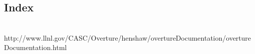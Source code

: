 \documentclass{article}
\begin{document}
\begin{htmlonly}
\clearpage
\section{Index}

\begin{flushleft}
 \\
{http://www.llnl.gov/CASC/Overture/henshaw/overtureDocumentation/overtureDocumentation.html} 
\end{flushleft}


\end{htmlonly}

\clearpage



\begin{latexonly}
\printindex
\end{latexonly}
\end{document}
